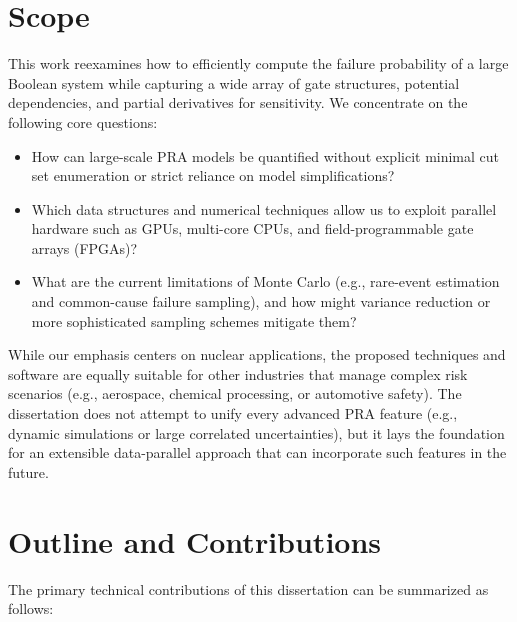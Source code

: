 \section{Scope}
This work reexamines how to efficiently compute the failure probability of a large Boolean system while capturing a wide array of gate structures, potential dependencies, and partial derivatives for sensitivity. We concentrate on the following core questions:

\begin{itemize}
   \item How can large-scale PRA models be quantified without explicit minimal cut set enumeration or strict reliance on model simplifications?
   \item Which data structures and numerical techniques allow us to exploit parallel hardware such as GPUs, multi-core CPUs, and field-programmable gate arrays (FPGAs)?
   \item What are the current limitations of Monte Carlo (e.g., rare-event estimation and common-cause failure sampling), and how might variance reduction or more sophisticated sampling schemes mitigate them?
\end{itemize}
While our emphasis centers on nuclear applications, the proposed techniques and software are equally suitable for other industries that manage complex risk scenarios (e.g., aerospace, chemical processing, or automotive safety). The dissertation does not attempt to unify every advanced PRA feature (e.g., dynamic simulations or large correlated uncertainties), but it lays the foundation for an extensible data-parallel approach that can incorporate such features in the future.

\clearpage
\section{Outline and Contributions}
The primary technical contributions of this dissertation can be summarized as follows:

